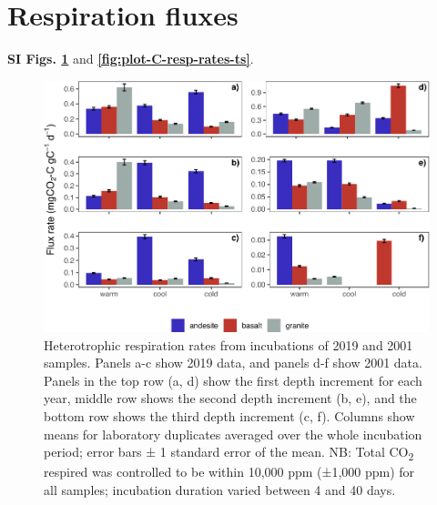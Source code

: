 \documentclass[english,man,floatsintext]{apa6}
\begin{document}
\hypertarget{respiration-fluxes}{%
\section{Respiration fluxes}\label{respiration-fluxes}}

\textbf{SI Figs. \ref{fig:plot-cmtv-flx-rates}} and \textbf{\ref{fig:plot-C-resp-rates-ts}}.

\begin{figure}

{\centering \includegraphics{sra-blk-inc-SI_files/figure-latex/plot-cmtv-flx-rates-1} 

}

\caption{Heterotrophic respiration rates from incubations of 2019 and 2001 samples. Panels a-c show 2019 data, and panels d-f show 2001 data. Panels in the top row (a, d) show the first depth increment for each year, middle row shows the second depth increment (b, e), and the bottom row shows the third depth increment (c, f). Columns show means for laboratory duplicates averaged over the whole incubation period; error bars ± 1 standard error of the mean. NB: Total CO\textsubscript{2} respired was controlled to be within 10,000 ppm (±1,000 ppm) for all samples; incubation duration varied between 4 and 40 days.}\label{fig:plot-cmtv-flx-rates}
\end{figure}
\end{document}
